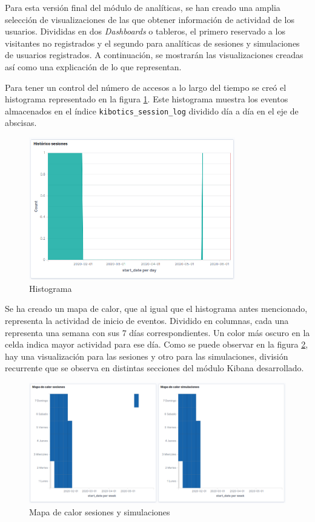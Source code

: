 \documentclass[11pt,a4paper]{book}
\begin{document}
				Para esta versión final del módulo de analíticas, se han creado una amplia selección de visualizaciones de las que obtener información de actividad de los usuarios. Divididas en dos \textit{Dashboards} o tableros, el primero reservado a los visitantes no registrados y el segundo para analíticas de sesiones y simulaciones de usuarios registrados. A continuación, se mostrarán las visualizaciones creadas así como una explicación de lo que representan.\\
				
\newpage		
				
				Para tener un control del número de accesos a lo largo del tiempo se creó el histograma representado en la figura \ref{fig:kibana_histogram}. Este histograma muestra los eventos almacenados en el índice \texttt{kibotics\_session\_log} dividido día a día en el eje de abscisas.	
				\begin{figure}[H]
					\centering
					\includegraphics[width=9cm, keepaspectratio]{img/kibana_01_histogram}
					\caption{Histograma}
					\label{fig:kibana_histogram}
				\end{figure}

				Se ha creado un mapa de calor, que al igual que el histograma antes mencionado, representa la actividad de inicio de eventos. Dividido en columnas, cada una representa una semana con sus 7 días correspondientes. Un color más oscuro en la celda indica mayor actividad para ese día. Como se puede observar en la figura \ref{fig:kibana_heatmap}, hay una visualización para las sesiones y otro para las simulaciones, división recurrente que se observa en distintas secciones del módulo Kibana desarrollado.
				\begin{figure}[H]
					\centering
					\includegraphics[width=13cm, keepaspectratio]{img/kibana_02_heatMap}
					\caption{Mapa de calor sesiones y simulaciones}
					\label{fig:kibana_heatmap}
				\end{figure}
\end{document}
